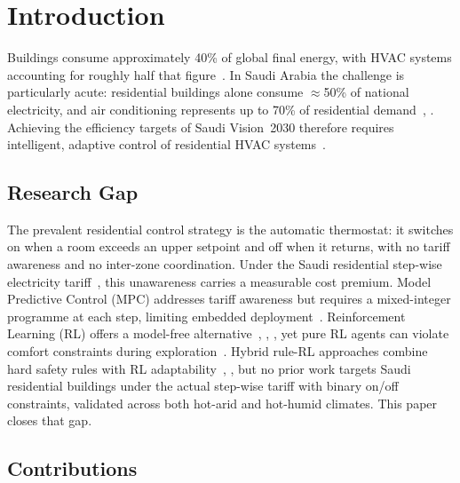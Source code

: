 \documentclass[3p,number]{elsarticle}
\let\oldsection\section
\renewcommand{\section}{\FloatBarrier\oldsection}
\let\oldsubsection\subsection
\renewcommand{\subsection}{\FloatBarrier\oldsubsection}
\begin{document}
\section{Introduction}
\label{sec:intro}
 
Buildings consume approximately 40\% of global final energy, with HVAC systems accounting for roughly half that figure~\cite{PerezLombard2008}.
In Saudi Arabia the challenge is particularly acute: residential buildings alone consume $\approx$50\% of national electricity, and air conditioning represents up to 70\% of residential demand~\cite{AlHomoud2021}, \cite{Krarti2020}.
Achieving the efficiency targets of Saudi Vision~2030 therefore requires intelligent, adaptive control of residential HVAC systems~\cite{Belaid2025}.
 
\subsection{Research Gap}
 
The prevalent residential control strategy is the automatic thermostat: it switches on when a room exceeds an upper setpoint and off when it returns, with no tariff awareness and no inter-zone coordination.
Under the Saudi residential step-wise electricity tariff~\cite{Nahiduzzaman2023,SEC2024}, this unawareness carries a measurable cost premium.
Model Predictive Control (MPC) addresses tariff awareness but requires a mixed-integer programme at each step, limiting embedded deployment~\cite{Risbeck2017}.
Reinforcement Learning (RL) offers a model-free alternative~\cite{AlSayed2024}, \cite{Biemann2021}, \cite{Azuatalam2020}, yet pure RL agents can violate comfort constraints during exploration~\cite{Xu2025}.
Hybrid rule-RL approaches combine hard safety rules with RL adaptability~\cite{Xu2025}, \cite{Solinas2024}, but no prior work targets Saudi residential buildings under the actual step-wise tariff with binary on/off constraints, validated across both hot-arid and hot-humid climates.
This paper closes that gap.
 
\subsection{Contributions}
 
\end{document}
